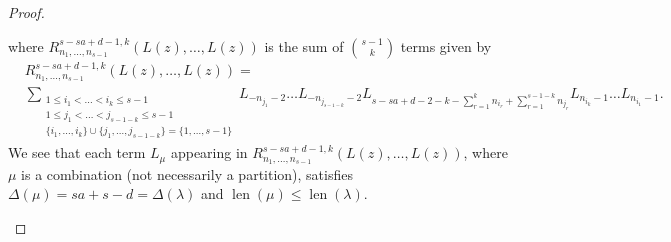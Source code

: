 \documentclass[a4paper, 12pt, reqno]{amsart}
\theoremstyle{remark}
\DeclareMathOperator{\len}{len}
\begin{document}
\begin{proof}
\begin{enumerate}
\begin{equation}
    \end{equation}
    where $R^{s - sa + d - 1, k}_{n_1, \dots, n_{s - 1}}(L(z), \dots, L(z))$ is the sum of $\binom{s - 1}{k}$ terms given by
    \begin{align*}
      &R^{s - sa + d - 1, k}_{n_1, \dots, n_{s - 1}}(L(z), \dots, L(z)) = \\
      &\sum_{\substack{1 \le i_1 < \dots < i_k \le s - 1 \\ 1 \le j_1 < \dots < j_{s - 1 - k} \le s - 1 \\ \{i_1, \dots, i_k\} \cup \{j_1, \dots, j_{s - 1 - k}\} = \{1, \dots, s - 1\}}}L_{-n_{j_1} - 2}\dots L_{-n_{j_{s - 1 - k}} - 2}L_{s - sa + d - 2 - k - \sum_{r = 1}^k n_{i_r} + \sum_{r = 1}^{s - 1 - k}n_{j_r}}L_{n_{i_k} - 1}\dots L_{n_{i_1} -1}.
    \end{align*}
    We see that each term $L_{\mu}$ appearing in $R^{s - sa + d - 1, k}_{n_1, \dots, n_{s - 1}}(L(z), \dots, L(z))$, where $\mu$ is a combination (not necessarily a partition), satisfies $\Delta(\mu) = sa + s - d = \Delta(\lambda)$ and $\len(\mu) \le \len(\lambda)$.
    

\end{enumerate}
\end{proof}
\end{document}
